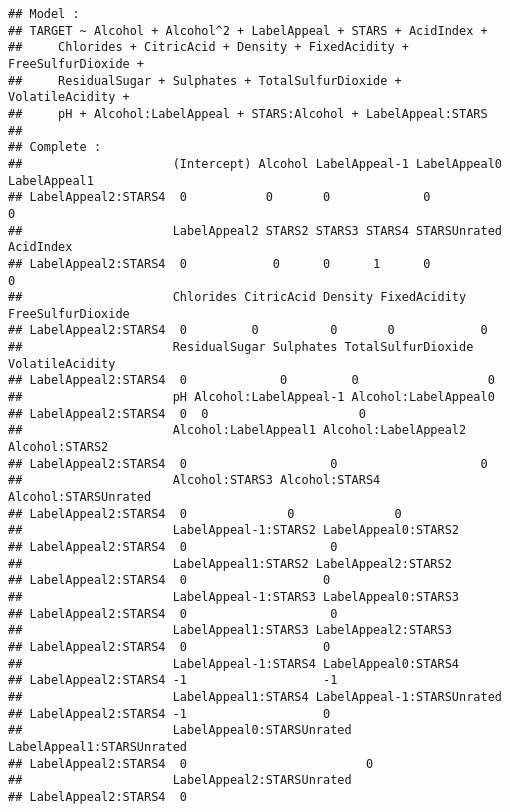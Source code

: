 \documentclass[
]{article}
\begin{document}
\begin{verbatim}
## Model :
## TARGET ~ Alcohol + Alcohol^2 + LabelAppeal + STARS + AcidIndex + 
##     Chlorides + CitricAcid + Density + FixedAcidity + FreeSulfurDioxide + 
##     ResidualSugar + Sulphates + TotalSulfurDioxide + VolatileAcidity + 
##     pH + Alcohol:LabelAppeal + STARS:Alcohol + LabelAppeal:STARS
## 
## Complete :
##                     (Intercept) Alcohol LabelAppeal-1 LabelAppeal0 LabelAppeal1
## LabelAppeal2:STARS4  0           0       0             0            0          
##                     LabelAppeal2 STARS2 STARS3 STARS4 STARSUnrated AcidIndex
## LabelAppeal2:STARS4  0            0      0      1      0            0       
##                     Chlorides CitricAcid Density FixedAcidity FreeSulfurDioxide
## LabelAppeal2:STARS4  0         0          0       0            0               
##                     ResidualSugar Sulphates TotalSulfurDioxide VolatileAcidity
## LabelAppeal2:STARS4  0             0         0                  0             
##                     pH Alcohol:LabelAppeal-1 Alcohol:LabelAppeal0
## LabelAppeal2:STARS4  0  0                     0                  
##                     Alcohol:LabelAppeal1 Alcohol:LabelAppeal2 Alcohol:STARS2
## LabelAppeal2:STARS4  0                    0                    0            
##                     Alcohol:STARS3 Alcohol:STARS4 Alcohol:STARSUnrated
## LabelAppeal2:STARS4  0              0              0                  
##                     LabelAppeal-1:STARS2 LabelAppeal0:STARS2
## LabelAppeal2:STARS4  0                    0                 
##                     LabelAppeal1:STARS2 LabelAppeal2:STARS2
## LabelAppeal2:STARS4  0                   0                 
##                     LabelAppeal-1:STARS3 LabelAppeal0:STARS3
## LabelAppeal2:STARS4  0                    0                 
##                     LabelAppeal1:STARS3 LabelAppeal2:STARS3
## LabelAppeal2:STARS4  0                   0                 
##                     LabelAppeal-1:STARS4 LabelAppeal0:STARS4
## LabelAppeal2:STARS4 -1                   -1                 
##                     LabelAppeal1:STARS4 LabelAppeal-1:STARSUnrated
## LabelAppeal2:STARS4 -1                   0                        
##                     LabelAppeal0:STARSUnrated LabelAppeal1:STARSUnrated
## LabelAppeal2:STARS4  0                         0                       
##                     LabelAppeal2:STARSUnrated
## LabelAppeal2:STARS4  0
\end{verbatim}
\end{document}
